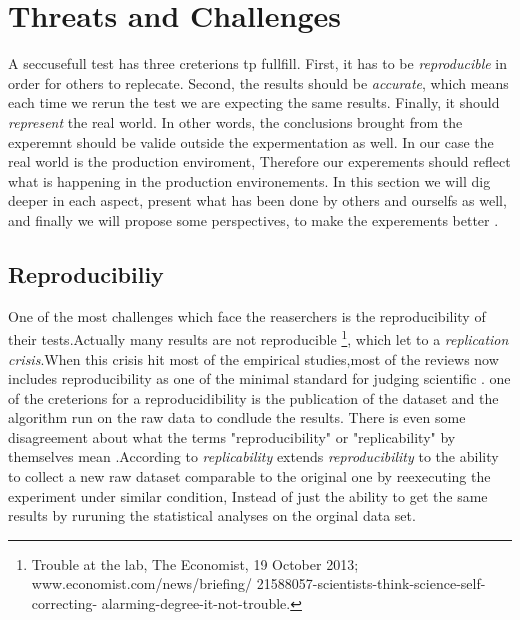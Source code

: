 \section{Threats and Challenges}

A seccusefull test has three creterions tp fullfill. First, it has to be \emph{reproducible} in order for others to replecate. Second, the results should be \emph{accurate}, which means each time we rerun the test we are expecting the same results. Finally, it should \emph{represent} the real world. In other words, the conclusions brought from the experemnt should be valide outside the expermentation as well. In our case the real world is the production enviroment, Therefore our experements should reflect what is happening in the production environements.
In this section we will dig deeper in each aspect, present what has been done by others and ourselfs as well, and finally we will propose some perspectives, to make the experements better .




\subsection{Reproducibiliy}

One of the most challenges which face the reaserchers is the reproducibility of their tests.Actually many results are not reproducible \footnote{Trouble at the lab, The Economist, 19 October 2013;  www.economist.com/news/briefing/ 21588057-scientists-think-science-self-correcting- alarming-degree-it-not-trouble.}, which let to a \emph{replication crisis}.When this crisis hit most of the empirical studies,most of the reviews now includes reproducibility as one of the minimal standard for judging scientific \cite{peng2011reproducible}. one of the creterions for a reproducidibility is the publication of the dataset and the algorithm run on the raw data to condlude the results. There is even some disagreement about what the terms "reproducibility" or "replicability" by themselves mean \cite{goodman2016does} .According to \cite{echtler2018open} \emph{replicability} extends \emph{reproducibility} to the ability to collect a new raw dataset comparable to the original one by reexecuting the experiment under similar condition, Instead of just the ability to get the same results by ruruning the statistical analyses on the orginal data set.

